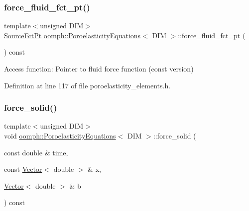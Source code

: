 \subsubsection{\texorpdfstring{force\+\_\+fluid\+\_\+fct\+\_\+pt()}{force\_fluid\_fct\_pt()}\hspace{0.1cm}{\footnotesize\ttfamily [2/2]}}
{\footnotesize\ttfamily template$<$unsigned D\+IM$>$ \\
\hyperlink{classoomph_1_1PoroelasticityEquations_a234bc29fbd4c3255ef903a3cb5f6361f}{Source\+Fct\+Pt} \hyperlink{classoomph_1_1PoroelasticityEquations}{oomph\+::\+Poroelasticity\+Equations}$<$ D\+IM $>$\+::force\+\_\+fluid\+\_\+fct\+\_\+pt (\begin{DoxyParamCaption}{ }\end{DoxyParamCaption}) const\hspace{0.3cm}{\ttfamily [inline]}}



Access function\+: Pointer to fluid force function (const version) 



Definition at line 117 of file poroelasticity\+\_\+elements.\+h.

\mbox{\label{classoomph_1_1PoroelasticityEquations_a2c770c55f51aa2c30febb44815a939cb}} 
\subsubsection{\texorpdfstring{force\+\_\+solid()}{force\_solid()}}
{\footnotesize\ttfamily template$<$unsigned D\+IM$>$ \\
void \hyperlink{classoomph_1_1PoroelasticityEquations}{oomph\+::\+Poroelasticity\+Equations}$<$ D\+IM $>$\+::force\+\_\+solid (\begin{DoxyParamCaption}\item[{const double \&}]{time,  }\item[{const \hyperlink{classoomph_1_1Vector}{Vector}$<$ double $>$ \&}]{x,  }\item[{\hyperlink{classoomph_1_1Vector}{Vector}$<$ double $>$ \&}]{b }\end{DoxyParamCaption}) const\hspace{0.3cm}{\ttfamily [inline]}}



